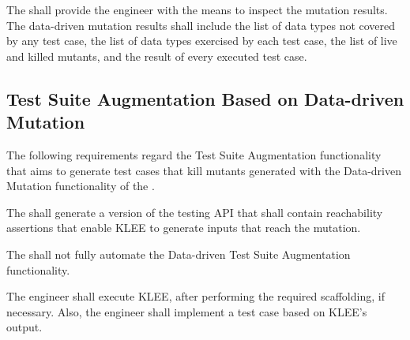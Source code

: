\RQ{} The \FAQAS shall provide the engineer with the means to inspect the mutation results. The \FAQAS data-driven mutation results shall include the list of data types not covered by any test case, the list of data types exercised by each test case, the list of live and killed mutants, and the result of every executed test case.


\subsection{Test Suite Augmentation Based on Data-driven Mutation}
\label{sec:codeDrivenAugmentation}

The following requirements regard the Test Suite Augmentation functionality that aims to generate test cases that kill mutants generated with the Data-driven Mutation functionality of the \FAQAS.

\RQ{} The \FAQAS shall generate a version of the testing API that shall contain reachability assertions that enable KLEE to generate inputs that reach the mutation.

\RQ{} The \FAQAS shall not fully automate the Data-driven Test Suite Augmentation functionality.

\remark The engineer shall execute KLEE, after performing the required scaffolding, if necessary.
Also, the engineer shall implement a test case based on KLEE's output.
